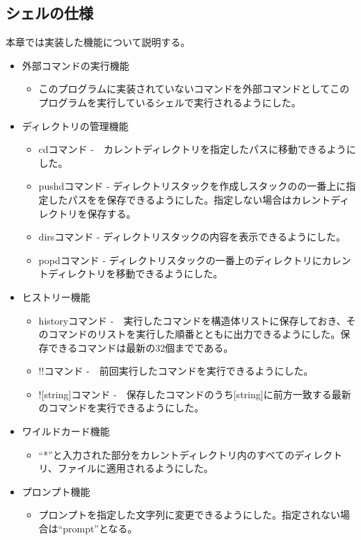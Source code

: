 \documentclass{procreport}
\begin{document}
\subsection{シェルの仕様}
本章では実装した機能について説明する。
\begin{itemize}
\item 外部コマンドの実行機能
\begin{itemize}
\item このプログラムに実装されていないコマンドを外部コマンドとしてこのプログラムを実行しているシェルで実行されるようにした。
\end{itemize}
\item ディレクトリの管理機能
\begin{itemize}
\item cdコマンド -　カレントディレクトリを指定したパスに移動できるようにした。
\item pushdコマンド - ディレクトリスタックを作成しスタックのの一番上に指定したパスをを保存できるようにした。指定しない場合はカレントディレクトリを保存する。
\item dirsコマンド - ディレクトリスタックの内容を表示できるようにした。
\item popdコマンド - ディレクトリスタックの一番上のディレクトリにカレントディレクトリを移動できるようにした。
\end{itemize}
\item ヒストリー機能
\begin{itemize}
\item historyコマンド -　実行したコマンドを構造体リストに保存しておき、そのコマンドのリストを実行した順番とともに出力できるようにした。保存できるコマンドは最新の32個までである。
\item !!コマンド -　前回実行したコマンドを実行できるようにした。
\item ![string]コマンド -　保存したコマンドのうち[string]に前方一致する最新のコマンドを実行できるようにした。
\end{itemize}
\item ワイルドカード機能
\begin{itemize}
\item ``*''と入力された部分をカレントディレクトリ内のすべてのディレクトリ、ファイルに適用されるようにした。
\end{itemize}
\item プロンプト機能
\begin{itemize}
\item プロンプトを指定した文字列に変更できるようにした。指定されない場合は``prompt''となる。
\end{itemize}

\end{itemize}
\end{document}
